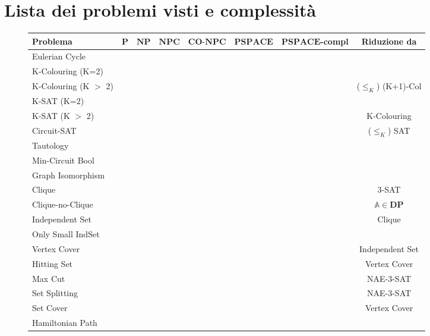 \documentclass[a4paper, 11pt]{article}
\newcommand{\p}{\mathbf{P}}
\newcommand{\np}{\mathbf{NP}}
\newcommand{\npc}{\mathbf{NPC}}
\newcommand{\conp}{\mathbf{CO}\text{-}\mathbf{NP}}
\newcommand{\pspace}{\mathbf{PSPACE}}
\newcommand{\prob}[1]{\mathbb{#1}}
\begin{document}
	\newpage
	\section{Lista dei problemi visti e complessità}
	\begin{figure}[h!]
		\begin{tabular}{lccccccc}
			\toprule
			\textbf{Problema} & {\small $ \p $} & {\small $ \np $} & {\small $ \npc $} & {\small $ \conp\mathbf{C} $} & {\small $ \pspace $} & {\small $ \pspace$-compl} & {\small \textbf{Riduzione da}}\\
			\midrule
			Eulerian Cycle & \checkmark & & & & \checkmark & & \\
			K-Colouring (K=2) & \checkmark & & & & \checkmark & & \\
			K-Colouring (K $>$ 2) & & \checkmark & \checkmark & & \checkmark & & ($ \leq_K $) (K+1)-Col  \\
			K-SAT (K=2) & \checkmark & & & & \checkmark & & \\
			K-SAT (K $>$ 2) & & \checkmark & \checkmark & & \checkmark & & K-Colouring\\
			Circuit-SAT & & \checkmark & \checkmark & & \checkmark &  & ($ \leq_K $) SAT\\
			Tautology & & & & \checkmark & \checkmark & & \\
			Min-Circuit Bool\footnotemark[1] & & & & & \checkmark & & \\
			Graph Isomorphism & & \checkmark & & & \checkmark & & \\
			Clique & & \checkmark & \checkmark & & \checkmark & & 3-SAT \\
			Clique-no-Clique & & \checkmark & \checkmark & & \checkmark & & $ \prob{A}\in\mathbf{DP} $\\
			Independent Set & & \checkmark & \checkmark & & \checkmark & & Clique \\
			Only Small IndSet & & & & \checkmark & \checkmark & & \\
			Vertex Cover & & \checkmark & \checkmark & & \checkmark & & Independent Set\\
			Hitting Set & & \checkmark & \checkmark & & \checkmark & & Vertex Cover \\
			Max Cut & & \checkmark & \checkmark & & \checkmark & & NAE-3-SAT\\
			Set Splitting & & \checkmark & \checkmark & & \checkmark & & NAE-3-SAT\\
			Set Cover & & \checkmark & \checkmark & & \checkmark & & Vertex Cover\\
			Hamiltonian Path & & \checkmark & \checkmark & & \checkmark & &  \\


\end{tabular}
\end{figure}
\end{document}
